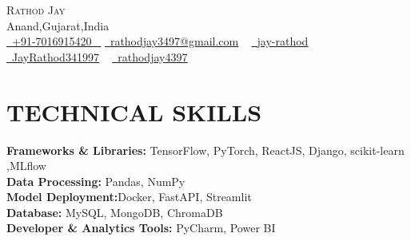 \documentclass[letterpaper,11pt]{article}
\begin{document}


\begin{center}
    {\Huge \scshape Rathod Jay} \\ \vspace{1pt}
    Anand,Gujarat,India \\ \vspace{1pt}
    \small \href{tel:+91 7016915420}{ \raisebox{-0.1\height}\faPhone\ \underline{+91-7016915420} ~} \href{mailto:rathodjay3497@gmail.com}{\raisebox{-0.2\height}\faEnvelope\  \underline{rathodjay3497@gmail.com}} ~ 
    \href{https://www.linkedin.com/in/rathodjay3497/}{\raisebox{-0.2\height}\faLinkedinSquare\ \underline{jay-rathod}}  ~
    \href{https://github.com/JayRathod341997}{\raisebox{-0.2\height}\faGithub\ \underline{JayRathod341997}} ~
    \href{https://www.hackerrank.com/rathodjay4397}{\raisebox{-0.2\height}\faHackerrank\ \underline{rathodjay4397}} ~
    
    \vspace{-8pt}

\end{center}


\section{TECHNICAL SKILLS}
 \begin{itemize}[leftmargin=0.15in, label={}]
    \small{\item{
    \textbf{\normalsize{Frameworks \& Libraries:}}{\normalsize{ TensorFlow, PyTorch, ReactJS, Django, scikit-learn ,MLflow }} \\
    
    \textbf{\normalsize{Data Processing:}}{ \normalsize{Pandas, NumPy}} \\
    
    \textbf{\normalsize{Model Deployment:}}{\normalsize{Docker, FastAPI, Streamlit}} \\
    
    \textbf{\normalsize{Database:}}{\normalsize{ MySQL, MongoDB, ChromaDB}} \\
    
    \textbf{\normalsize{Developer \& Analytics Tools:}}{\normalsize{ PyCharm, Power BI }} \\

    }}
 \end{itemize}
 \vspace{-12pt}


\end{document}
